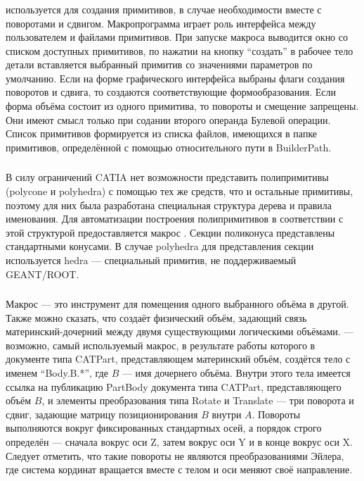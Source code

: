 \subsubsection{}\label{sec:secMacroAddShape}

 используется для создания примитивов, в случае необходимости вместе с поворотами и сдвигом. Макропрограмма играет роль интерфейса между пользователем и файлами примитивов. При запуске макроса выводится окно со списком доступных примитивов, по нажатии на кнопку ``создать'' в рабочее тело детали вставляется выбранный примитив со значениями параметров по умолчанию. Если на форме графического интерфейса выбраны флаги создания поворотов и сдвига, то создаются соответствующие формообразования. Если форма объёма состоит из одного примитива, то повороты и смещение запрещены. Они имеют смысл только при содании второго операнда Булевой операции. Список примитивов формируется из списка файлов, имеющихся в папке примитивов, определённой с помощью относительного пути в BuilderPath.

\subsubsection{}\label{sec:secMacroPoly}

В силу ограничений CATIA нет возможности представить полипримитивы (polycone и polyhedra) с помощью тех же средств, что и остальные примитивы, поэтому для них была разработана специальная структура дерева и правила именования. Для автоматизации построения полипримитивов в соответствии с этой структурой предоставляется макрос . Секции поликонуса представлены стандартными конусами. В случае polyhedra для представления секции используется hedra --- специальный примитив, не поддерживаемый GEANT/ROOT.

\subsubsection{}\label{sec:secMacroInserter}

Макрос  --- это инструмент для помещения одного выбранного объёма в другой. Также можно сказать, что  создаёт физический объём, задающий связь материнский-дочерний между двумя существующими логическими объёмами.  --- возможно, самый используемый макрос, в результате работы которого в документе типа CATPart, представляющем материнский объём, создётся тело с именем ``Body.B.*'', где $B$ --- имя дочернего объёма. Внутри этого тела имеется ссылка на публикацию PartBody документа типа CATPart, представляющего объём $B$, и элементы преобразования типа Rotate и Translate --- три поворота и сдвиг, задающие матрицу позиционирования $B$ внутри $A$. Повороты выполняются вокруг фиксированных стандартных осей, а порядок строго определён --- сначала вокрус оси Z, затем вокрус оси Y и в конце вокрус оси X. Следует отметить, что такие повороты не являются преобразованиями Эйлера, где система кординат вращается вместе с телом и оси меняют своё направление.

